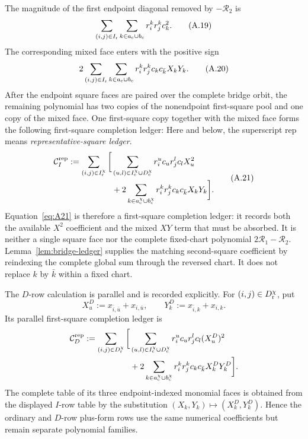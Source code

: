 \documentclass[11pt]{article}
\begin{document}
The magnitude of the first endpoint diagonal removed by
$-\mathcal R_2$ is
\begin{equation}\label{eq:A19}
\sum_{(i,j)\in I_{\rm r}}\sum_{k\in a_{\rm c}\cup b_{\rm c}}
r_i^kr_j^kc_k^2.
\tag{A.19}
\end{equation}
The corresponding mixed face enters with the positive sign
\begin{equation}\label{eq:A20}
2\sum_{(i,j)\in I_{\rm r}}\sum_{k\in a_{\rm c}\cup b_{\rm c}}
r_i^kr_j^kc_kc_{\bar k}X_kY_k.
\tag{A.20}
\end{equation}
After the endpoint square faces are paired over the complete bridge orbit, the
remaining polynomial has two copies of the nonendpoint first-square pool and
one copy of the mixed face.  One first-square copy together with the mixed
face forms the following first-square completion ledger:
Here and below, the superscript $\mathrm{rep}$ means
\emph{representative-square ledger}.
\begin{equation}\label{eq:A21}
\begin{aligned}
\mathcal C_I^{\mathrm{rep}}
:=
\sum_{(i,j)\in I_{\rm r}^\chi}\bigg[
&\sum_{(u,l)\in I_{\rm c}^\chi\cup D_{\rm c}^\chi}
 r_i^uc_u r_j^lc_l X_u^2\\
&+2\sum_{k\in a_{\rm c}^\chi\cup b_{\rm c}^\chi}
 r_i^kr_j^kc_kc_{\bar k}X_kY_k
\bigg].
\end{aligned}
\tag{A.21}
\end{equation}
Equation~\eqref{eq:A21} is therefore a first-square completion ledger: it
records both the available $X^2$ coefficient and the mixed $XY$ term that
must be absorbed.  It is neither a single square face nor the complete
fixed-chart polynomial $2\mathcal R_1-\mathcal R_2$.
Lemma~\ref{lem:bridge-ledger} supplies the matching second-square coefficient
by reindexing the complete global sum through the reversed chart.  It does
not replace $k$ by $\bar k$ within a fixed chart.

The $D$-row calculation is parallel and is recorded explicitly.  For
$(i,j)\in D_{\rm r}^\chi$, put
\[
X_u^D:=x_{\bar i,\bar u}+x_{i,\bar u},\qquad
Y_k^D:=x_{\bar i,k}+x_{i,k}.
\]
Its parallel first-square completion ledger is
\[
\begin{aligned}
\mathcal C_D^{\mathrm{rep}}
:=\sum_{(i,j)\in D_{\rm r}^\chi}\bigg[
&\sum_{(u,l)\in I_{\rm c}^\chi\cup D_{\rm c}^\chi}
r_i^uc_u r_j^lc_l(X_u^D)^2\\
&+2\sum_{k\in a_{\rm c}^\chi\cup b_{\rm c}^\chi}
r_i^kr_j^kc_kc_{\bar k}X_k^DY_k^D
\bigg].
\end{aligned}
\]
The complete table of its three endpoint-indexed monomial faces is obtained
from the displayed $I$-row table by the substitution
$(X_k,Y_k)\mapsto(X_k^D,Y_k^D)$.  Hence the ordinary and $D$-row plus-form
rows use
the same numerical coefficients but remain separate polynomial families.
\end{document}
